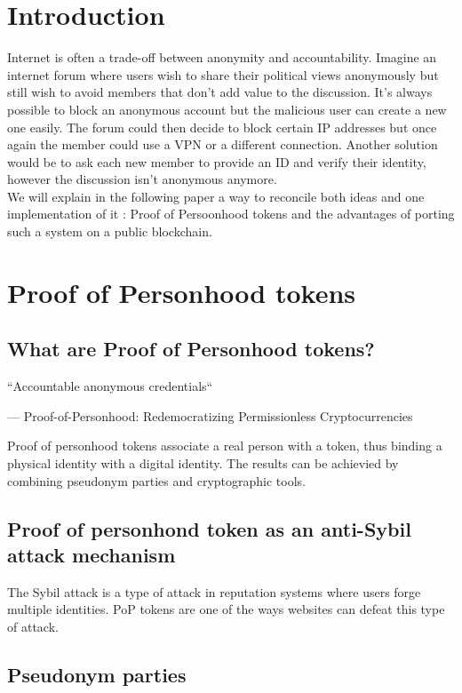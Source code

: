 \documentclass[11pt, a4paper, twoside, openright]{book} %
\begin{document}

\tableofcontents



\newpage
\section{Introduction}
Internet is often a	trade-off between anonymity and accountability. Imagine an internet forum where users wish to share their political views anonymously but still wish to avoid members that don't add value to the discussion. It's always possible to block an anonymous account but the malicious user can create a new one easily. The forum could then decide to block certain IP addresses but once again the member could use a VPN or a different connection. Another solution would be to ask each new member to provide an ID and verify their identity, however the discussion isn't anonymous anymore. \\
We will explain in the following paper a way to reconcile both ideas and one implementation of it : Proof of Persoonhood tokens and the advantages of porting such a system on a public blockchain.



\section{Proof of Personhood tokens}
\subsection{What are Proof of Personhood tokens?}

\epigraph{``Accountable anonymous credentials``}
{--- \textup{Proof-of-Personhood: Redemocratizing Permissionless Cryptocurrencies}}

Proof of personhood tokens associate a real person with a token, thus binding a physical identity with a digital identity. The results can be achievied by combining pseudonym parties and cryptographic tools.
\subsection{Proof of personhond token as an anti-Sybil attack mechanism}
The Sybil attack is a type of attack in reputation systems where users forge multiple identities. PoP tokens are one of the ways websites can defeat this type of attack.
\subsection{Pseudonym parties}
\end{document}
